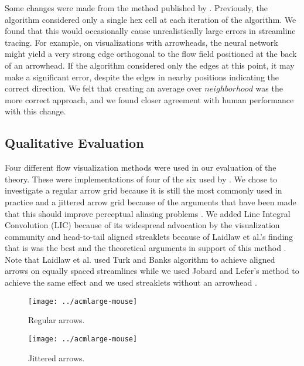\documentclass[prodmode,hillsideplop]{../acmlarge}
\begin{document}
Some changes were made from the method published by
. Previously, the algorithm considered only a single
hex cell at each iteration of the algorithm. We found that this would
occasionally cause unrealistically large errors in streamline
tracing. For example, on visualizations with arrowheads, the neural
network might yield a very strong edge orthogonal to the flow field
positioned at the back of an arrowhead. If the algorithm considered
only the edges at this point, it may make a significant error,
despite the edges in nearby positions indicating the correct
direction. We felt that creating an average over $neighborhood$ was
the more correct approach, and we found closer agreement with human
performance with this change.

\subsection{Qualitative Evaluation}
Four different flow visualization methods were used in our evaluation
of the theory. These were implementations of four of the six used by
. We chose to investigate a regular arrow grid
because it is still the most commonly used in practice and a jittered
arrow grid because of the arguments that have been made that this
should improve perceptual aliasing problems \cite{Turk1996}. We added
Line Integral Convolution (LIC) because of its widespread advocation
by the visualization community \cite{Cabral1993} and head-to-tail
aligned streaklets because of Laidlaw et al.'s finding that is was
the best and the theoretical arguments in support of this method
\cite{Ware2008}. Note that Laidlaw et al. used Turk and Banks
algorithm to achieve aligned arrows on equally spaced streamlines
while we used Jobard and Lefer's \citeyear{Jobard1997} method to
achieve the same effect and we used streaklets without an arrowhead
\cite{Fowler1989}.

\begin{figure}[tp]
    \begin{minipage}[t]{0.45\linewidth}
        \centering
        \texttt{[image: ../acmlarge-mouse]}
        \caption{Regular arrows.}
        \label{regularfig}
    \end{minipage}
    \hspace{0.1\linewidth}
    \begin{minipage}[t]{0.45\linewidth}
        \centering
        \texttt{[image: ../acmlarge-mouse]}
        \caption{Jittered arrows.}
        \label{jitteredfig}
    \end{minipage}
\end{figure}
\end{document}
